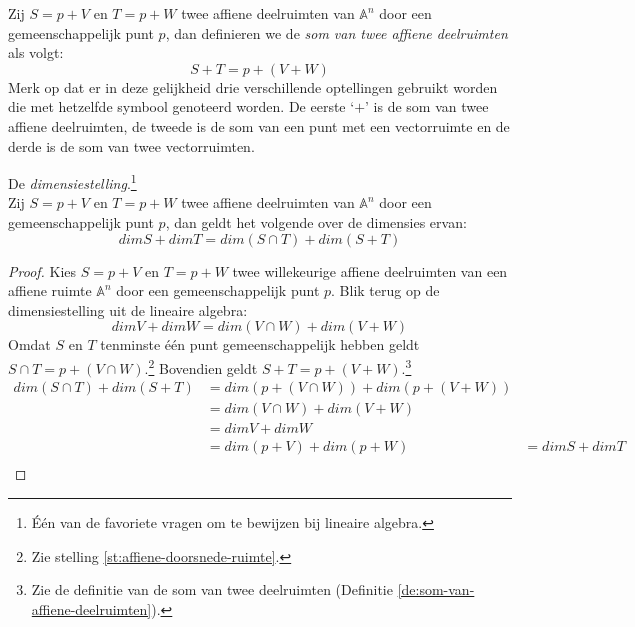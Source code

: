 \documentclass[main.tex]{subfiles}
\begin{document}
\begin{de}
\label{de:som-van-affiene-deelruimten}
  Zij $S = p + V$ en $T = p + W$ twee affiene deelruimten van $\mathbb{A}^{n}$ door een gemeenschappelijk punt $p$, dan definieren we de \emph{som van twee affiene deelruimten} als volgt:
  \[ S + T = p + (V + W) \]
  Merk op dat er in deze gelijkheid drie verschillende optellingen gebruikt worden die met hetzelfde symbool genoteerd worden. De eerste `$+$' is de som van twee affiene deelruimten, de tweede is de som van een punt met een vectorruimte en de derde is de som van twee vectorruimten.
\end{de}

\begin{st}
  \label{st:dimensiestelling}
  De \emph{dimensiestelling}.\footnote{\'E\'en van de favoriete vragen om te bewijzen bij lineaire algebra.}\\
  Zij $S = p + V$ en $T = p + W$ twee affiene deelruimten van $\mathbb{A}^{n}$ door een gemeenschappelijk punt $p$, dan geldt het volgende over de dimensies ervan:
  \[ dim S + dim T = dim(S \cap T) + dim (S + T) \]

  \begin{proof}
    Kies $S = p + V$ en $T = p + W$ twee willekeurige affiene deelruimten van een affiene ruimte $\mathbb{A}^{n}$ door een gemeenschappelijk punt $p$.
    Blik terug op de dimensiestelling uit de lineaire algebra:
    \[ dim V + dim W = dim(V \cap W) + dim (V + W) \]
    Omdat $S$ en $T$ tenminste \'e\'en punt gemeenschappelijk hebben geldt $S \cap T = p + (V \cap W)$.\footnote{Zie stelling \ref{st:affiene-doorsnede-ruimte}.} Bovendien geldt $S + T = p + (V + W)$.\footnote{Zie de definitie van de som van twee deelruimten (Definitie \ref{de:som-van-affiene-deelruimten}).} 
    \[
    \begin{array}{rll}
       dim(S \cap T) + dim (S + T) &= dim(p + (V \cap W)) + dim(p + (V + W)) &\\
                    &= dim(V \cap W) + dim (V + W)&\\
                    &= dim V + dim W&\\
                    &= dim(p + V) + dim(p + W) &= dim S + dim T\\
    \end{array}
    \]

  \end{proof}
\end{st}
\end{document}
